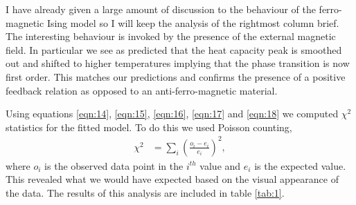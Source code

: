 \documentclass[a4paper, twocolumn]{article}
\begin{document}
I have already given a large amount of discussion to the behaviour of %
the ferro-magnetic Ising model so I will keep the analysis of the %
rightmost column brief. The interesting behaviour is invoked by the %
presence of the external magnetic field. In particular we see as predicted %
that the heat capacity peak is smoothed out and shifted to higher %
temperatures implying that the phase transition is now first order. %
This matches our predictions and confirms the presence of a positive %
feedback relation as opposed to an anti-ferro-magnetic material. 


Using equations \ref{eqn:14}, \ref{eqn:15}, \ref{eqn:16}, \ref{eqn:17} and %
\ref{eqn:18} we computed \(\chi^{2}\) statistics for the fitted model. %
To do this we used Poisson counting,
%
\begin{align}
    \chi^{2} &= \sum_{i}\left(\frac{o_{i} - e_{i}}{e_{i}}\right)^{2},
    \label{eqn:19}
\end{align}
%
where \(o_{i}\) is the observed data point in the \(i^{th}\) value and %
\(e_{i}\) is the expected value. This revealed what we would have expected %
based on the visual appearance of the data. The results of this analysis %
are included in table \ref{tab:1}.
\end{document}

